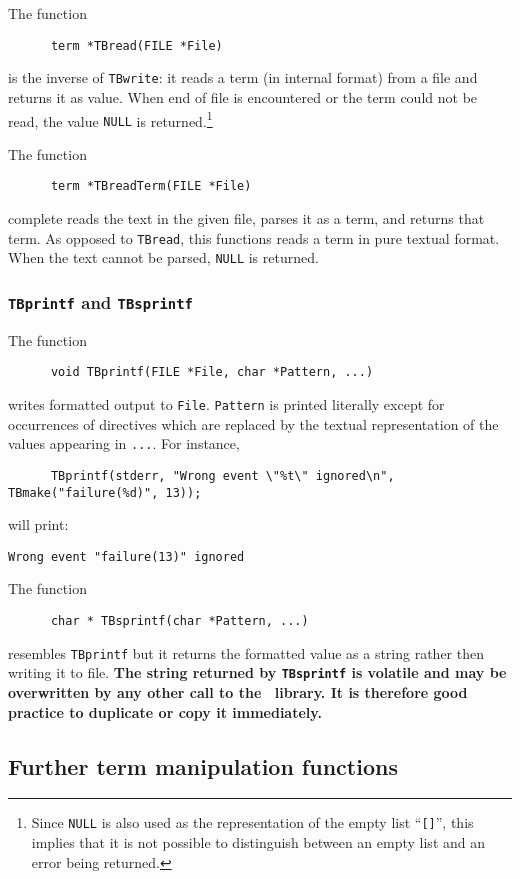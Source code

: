 \documentclass[a4,twoside,noweb]{article} %
\begin{document}
The function
\begin{verbatim}
      term *TBread(FILE *File)
\end{verbatim}
is the inverse of {\tt TBwrite}: it reads a term (in internal format)
from a file and returns it as value. When end of file is encountered
or the term could not be read, the value {\tt NULL} is
returned.\footnote{Since {\tt NULL} is also used as the representation
of the empty list ``{\tt []}'', this implies that it is not possible
to distinguish between an empty list and an error being returned.}

The function
\begin{verbatim}
      term *TBreadTerm(FILE *File)
\end{verbatim}
complete reads the text in the given file, parses it as a term, and returns that term.
As opposed to {\tt TBread}, this functions reads a term in pure textual
format. When the text cannot be parsed, {\tt NULL} is returned.

\subsubsection{\label{TBprintf}{\tt TBprintf} and {\tt TBsprintf}}
The function
\begin{verbatim}
      void TBprintf(FILE *File, char *Pattern, ...)
\end{verbatim}
writes formatted output to {\tt File}.
{\tt Pattern} is printed literally except for occurrences
of directives which are replaced by the textual representation
of the values appearing in {\tt ...}. For instance,
\begin{verbatim}
      TBprintf(stderr, "Wrong event \"%t\" ignored\n", TBmake("failure(%d)", 13));
\end{verbatim}
will print:
\begin{verbatim}
Wrong event "failure(13)" ignored
\end{verbatim}

\noindent The function
\begin{verbatim}
      char * TBsprintf(char *Pattern, ...)
\end{verbatim}
resembles {\tt TBprintf} but it returns the formatted value as a string
rather then writing it to file. {\bf The string returned by {\tt TBsprintf}
is volatile and may be overwritten by any other call to the
\TB\ library. It is therefore good practice to duplicate or
copy it immediately.}

\subsection{\label{TermManipulation}Further term manipulation functions}
\end{document}
